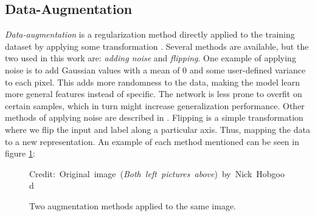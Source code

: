 \subsection{Data-Augmentation} \label{data-augmentation}
     \textit{Data-augmentation} is a regularization method directly applied to the training dataset by applying some transformation \cite{kukavcka2017_regularization}. Several methods are available, but the two used in this work are: \textit{adding noise} and \textit{flipping}. One example of applying noise is to add Gaussian values with a mean of 0 and some user-defined variance to each pixel. This adds more randomness to the data, making the model learn more general features instead of specific. The network is less prone to overfit on certain samples, which in turn might increase generalization performance. Other methods of applying noise are described in \citeauthor{kukavcka2017_regularization} \cite{kukavcka2017_regularization}. Flipping is a simple transformation where we flip the input and label along a particular axis. Thus, mapping the data to a new representation. An example of each method mentioned can be seen in figure \ref{data augmentation fig}:
    \begin{figure}[H]
        \centering
        
        
        
        
        \caption[Two data augmentation examples]{Two augmentation methods applied to the same image.}
        \medskip 
        \hspace*{15pt}\hbox{\scriptsize Credit: Original image (\textit{Both left pictures above}) by Nick Hobgood \cite{clownfish_image}}
        \label{data augmentation fig}
        
        \end{figure}
    

